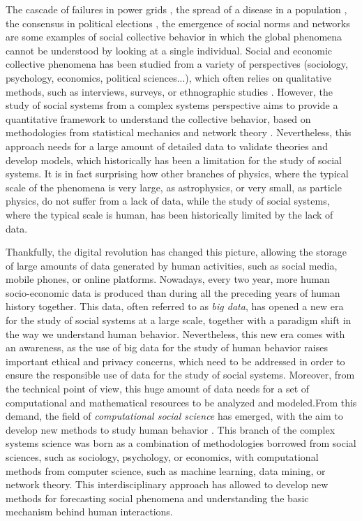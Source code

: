 The cascade of failures in power grids \cite{}, the spread of a disease in a population \cite{}, the consensus in political elections \cite{}, the emergence of social norms \cite{} and networks \cite{} are some examples of social collective behavior in which the global phenomena cannot be understood by looking at a single individual. Social and economic collective phenomena has been studied from a variety of perspectives (sociology, psychology, economics, political sciences...), which often relies on qualitative methods, such as interviews, surveys, or ethnographic studies \cite{}. However, the study of social systems from a complex systems perspective aims to provide a quantitative framework to understand the collective behavior, based on methodologies from statistical mechanics and network theory \cite{}. Nevertheless, this approach needs for a large amount of detailed data to validate theories and develop models, which historically has been a limitation for the study of social systems. It is in fact surprising how other branches of physics, where the typical scale of the phenomena is very large, as astrophysics, or very small, as particle physics, do not suffer from a lack of data, while the study of social systems, where the typical scale is human, has been historically limited by the lack of data.

Thankfully, the digital revolution has changed this picture, allowing the storage of large amounts of data generated by human activities, such as social media, mobile phones, or online platforms. Nowadays, every two year, more human socio-economic data is produced than during all the preceding years of human history together. This data, often referred to as \textit{big data}, has opened a new era for the study of social systems at a large scale, together with a paradigm shift in the way we understand human behavior. Nevertheless, this new era comes with an awareness, as the use of big data for the study of human behavior raises important ethical and privacy concerns, which need to be addressed in order to ensure the responsible use of data for the study of social systems. Moreover, from the technical point of view, this huge amount of data needs for a set of computational and mathematical resources to be analyzed and modeled.From this demand, the field of \textit{computational social science} has emerged, with the aim to develop new methods to study human behavior \cite{}. This branch of the complex systems science was born as a combination of methodologies borrowed from social sciences, such as sociology, psychology, or economics, with computational methods from computer science, such as machine learning, data mining, or network theory. This interdisciplinary approach has allowed to develop new methods for forecasting social phenomena and understanding the basic mechanism behind human interactions. 

